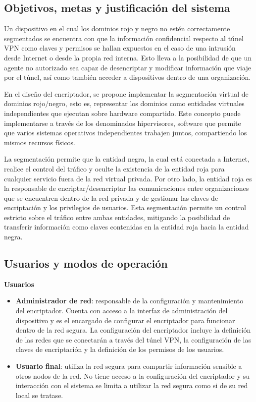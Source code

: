\clearpage

\subsection{Objetivos, metas y justificación del sistema}

Un dispositivo en el cual los dominios rojo y negro no estén correctamente segmentados se encuentra con que la información confidencial respecto al túnel VPN como claves y permisos se hallan expuestos en el caso de una intrusión desde Internet o desde la propia red interna. Esto lleva a la posibilidad de que un agente no autorizado sea capaz de desencriptar y modificar información que viaje por el túnel, así como también acceder a dispositivos dentro de una organización.

En el diseño del encriptador, se propone implementar la segmentación virtual de dominios rojo/negro, esto es, representar los dominios como entidades virtuales independientes que ejecutan sobre hardware compartido. Este concepto puede implementarse a través de los denominados hipervisores, software que permite que varios sistemas operativos independientes trabajen juntos, compartiendo los mismos recursos físicos.

La segmentación permite que la entidad negra, la cual está conectada a Internet, realice el control del tráfico y oculte la existencia de la entidad roja para cualquier servicio fuera de la red virtual privada. Por otro lado, la entidad roja es la responsable de encriptar/desencriptar las comunicaciones entre organizaciones que se encuentren dentro de la red privada y de gestionar las claves de encriptación y los privilegios de usuarios. Esta segmentación permite un control estricto sobre el tráfico entre ambas entidades, mitigando la posibilidad de transferir información como claves contenidas en la entidad roja hacia la entidad negra.


\subsection{Usuarios y modos de operación}

\begin{center}
    \textbf{Usuarios}
\end{center}

\begin{itemize}
    \item \textbf{Administrador de red}: responsable de la configuración y mantenimiento del encriptador. Cuenta con acceso a la interfaz de administración del dispositivo y es el encargado de configurar el encriptador para funcionar dentro de la red segura. La configuración del encriptador incluye la definición de las redes que se conectarán a través del túnel VPN, la configuración de las claves de encriptación y la definición de los permisos de los usuarios.
    \item \textbf{Usuario final}: utiliza la red segura para compartir información sensible a otros nodos de la red. No tiene acceso a la configuración del encriptador y su interacción con el sistema se limita a utilizar la red segura como si de su red local se tratase.
\end{itemize}

